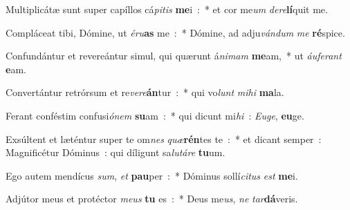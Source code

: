 \item Multiplicátæ sunt super capíllos cá\emph{pi}\emph{tis} \textbf{me}i~:~* et cor me\emph{um} \emph{de}\emph{re}\textbf{lí}quit me.
\item Compláceat tibi, Dómine, ut \emph{é}\emph{ru}\textbf{as} me~:~* Dómine, ad adju\emph{ván}\emph{dum} \emph{me} \textbf{ré}spice.
\item Confundántur et revereántur simul, qui quærunt á\emph{ni}\emph{mam} \textbf{me}am,~* ut \emph{áu}\emph{fe}\emph{rant} \textbf{e}am.
\item Convertántur retrórsum et re\emph{ve}\emph{re}\textbf{án}tur~:~* qui vo\emph{lunt} \emph{mi}\emph{hi} \textbf{ma}la.
\item Ferant conféstim confusi\emph{ó}\emph{nem} \textbf{su}am~:~* qui dicunt mi\emph{hi}~: \emph{Eu}\emph{ge}, \textbf{eu}ge.
\item Exsúltent et læténtur super te om\emph{nes} \emph{quæ}\textbf{rén}tes te~:~* et dicant semper~: Magnificétur Dóminus~: qui díligunt sa\emph{lu}\emph{tá}\emph{re} \textbf{tu}um.
\item Ego autem mendícus \emph{sum}, \emph{et} \textbf{pau}per~:~* Dóminus sollí\emph{ci}\emph{tus} \emph{est} \textbf{me}i.
\item Adjútor meus et protéctor \emph{me}\emph{us} \textbf{tu} es~:~* Deus me\emph{us}, \emph{ne} \emph{tar}\textbf{dá}veris.